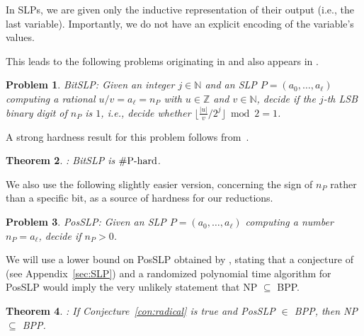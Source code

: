 \documentclass{article}
\theoremstyle{plain}
\newtheorem{theorem}{Theorem}[section]
\newtheorem{problem}[theorem]{Problem}
\theoremstyle{definition}
\theoremstyle{remark}
\begin{document}
In SLPs, we are given only the inductive representation of their output (i.e., the last variable). Importantly, we do not have an explicit encoding of the variable's values.

This leads to the following problems originating in \cite{DBLP:journals/siamcomp/AllenderBKM09} and also appears in \cite{koiran2011interpolation,DBLP:conf/fsttcs/BlaserDJ24}. 

\begin{problem}
	\label{prob:BitSLP_p}
	\textnormal{\textsf{BitSLP:}} Given an integer $j \in \mathbb{N}$ and an \textnormal{SLP} $P = (a_0,\ldots,a_{\ell})$ computing a rational $u/v = a_{\ell} = n_P$ with $u \in \mathbb{Z}$ and $v \in \mathbb{N}$, decide if the $j$-th \textnormal{LSB} binary digit of $n_P$ is $1$, i.e., decide whether $\lfloor \tfrac{|u|}{v} / 2^j \rfloor \bmod 2 = 1$. 
\end{problem}

A strong hardness result for this problem follows from~\cite{DBLP:journals/siamcomp/AllenderBKM09}. 

\begin{theorem}
	\label{thm:BitSLP}
\cite{DBLP:journals/siamcomp/AllenderBKM09}: 
\textnormal{\textsf{BitSLP}} is $\textnormal{\#P-hard}$. 
\end{theorem}

We also use the following slightly easier version, concerning the sign of $n_P$ rather than a specific bit, as a source of hardness for our reductions. 
\begin{problem}
	\label{prob:SLP}
	\textnormal{\textsf{PosSLP:}} Given an \textnormal{SLP} $P = (a_0,\ldots,a_{\ell})$ computing a number $n_P = a_{\ell}$, decide if $n_P > 0$. 
\end{problem}

We will use a lower bound on \textnormal{PosSLP} obtained by \cite{DBLP:conf/soda/BurgisserJ24}, stating that a conjecture of \cite{10.1145/3510359} (see Appendix~\ref{sec:SLP}) and a randomized polynomial time algorithm for PosSLP would imply the very unlikely statement that \textnormal{NP} $\subseteq$ \textnormal{BPP}.  

\begin{theorem}
	\label{thm:PosSLP'}
	\cite{DBLP:conf/soda/BurgisserJ24}: If \textnormal{Conjecture~\ref{con:radical}} is true and \textnormal{PosSLP} $\in$ \textnormal{BPP}, then \textnormal{NP} $\subseteq$ \textnormal{BPP}.
\end{theorem}
\end{document}
